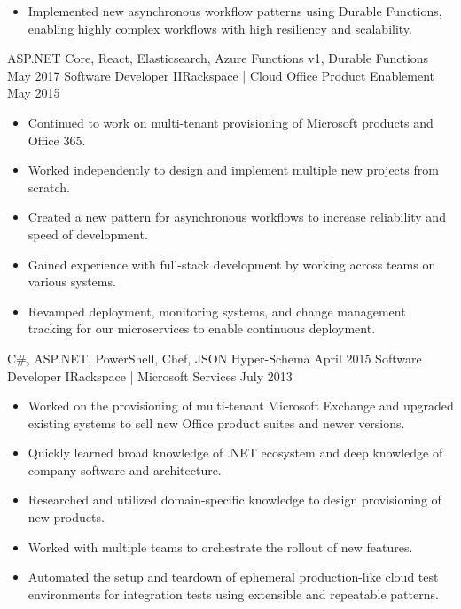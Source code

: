 \begin{experiences}
{\begin{itemize}
                        \item Implemented new asynchronous workflow patterns using Durable Functions, enabling highly complex workflows with high resiliency and scalability.
                      \end{itemize}
                    }
                    {ASP.NET Core, React, Elasticsearch, Azure Functions v1, Durable Functions}
  \emptySeparator
  \experience
    {May 2017}     {Software Developer II}{Rackspace | Cloud Office Product Enablement}
    {May 2015}     {
                      \begin{itemize}
                        \item Continued to work on multi-tenant provisioning of Microsoft products and Office 365.
                        \item Worked independently to design and implement multiple new projects from scratch.
                        \item Created a new pattern for asynchronous workflows to increase reliability and speed of development.
                        \item Gained experience with full-stack development by working across teams on various systems.
                        \item Revamped deployment, monitoring systems, and change management tracking for our microservices to enable continuous deployment.
                      \end{itemize}
                    }
                    {C\#, ASP.NET, PowerShell, Chef, JSON Hyper-Schema}
  \emptySeparator
  \experience
  {April 2015}       {Software Developer I}{Rackspace | Microsoft Services}
  {July 2013}        {
                      \begin{itemize}
                        \item Worked on the provisioning of multi-tenant Microsoft Exchange and upgraded existing systems to sell new Office product suites and newer versions.
                        \item Quickly learned broad knowledge of .NET ecosystem and deep knowledge of company software and architecture.
                        \item Researched and utilized domain-specific knowledge to design provisioning of new products.
                        \item Worked with multiple teams to orchestrate the rollout of new features.
                        \item Automated the setup and teardown of ephemeral production-like cloud test environments for integration tests using extensible and repeatable patterns.

\end{itemize}}
\end{experiences}
